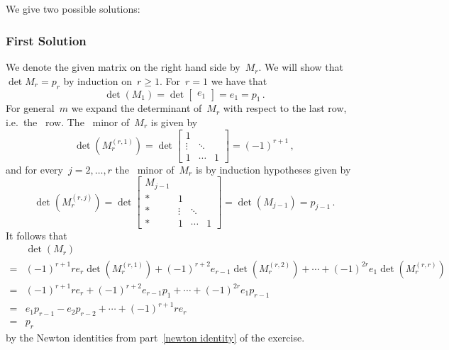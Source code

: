 \subsection{}

We give two possible solutions:



\subsubsection{First Solution}

We denote the given matrix on the right hand side by~$M_r$.
We will show that~$\det M_r = p_r$ by induction on~$r \geq 1$.
For~$r = 1$ we have that
\[
    \det( M_1 )
  = \det
    \begin{bmatrix}
      e_1
    \end{bmatrix}
  = e_1
  = p_1 \,.
\]
For general~$m$ we expand the determinant of~$M_r$ with respect to the last row, i.e.\ the~ row.
The~ minor of~$M_r$ is given by
\[
    \det( M_r^{(r,1)} )
  = \det
    \begin{bmatrix}
      1       &         &   \\
      \vdots  & \ddots  &   \\
      1       & \cdots  & 1
    \end{bmatrix}
  = (-1)^{r+1} \,,
\]
and for every~$j = 2, \dotsc, r$ the~ minor of~$M_r$ is by induction hypotheses given by
\[
    \det( M_r^{(r,j)} )
  = \det
    \begin{bmatrix}
      M_{j-1}   &         &         &   \\
      *         & 1       &         &   \\
      *         & \vdots  & \ddots  &   \\
      *         & 1       & \cdots  & 1
    \end{bmatrix}
  = \det( M_{j-1} )
  = p_{j-1} \,.
\]
It follows that
\begin{align*}
   {}&  \det(M_r) \\
  ={}&    (-1)^{r+1} r e_r\det( M_r^{(r,1)} )
        + (-1)^{r+2} e_{r-1} \det( M_r^{(r,2)} )
        + \dotsb
        + (-1)^{2r}  e_1 \det( M_r^{(r,r)} )  \\
  ={}&    (-1)^{r+1} r e_r
        + (-1)^{r+2} e_{r-1} p_1
        + \dotsb
        + (-1)^{2r} e_1 p_{r-1} \\
  ={}&    e_1 p_{r-1}
        - e_2 p_{r-2}
        + \dotsb
        + (-1)^{r+1} r e_r  \\
  ={}&  p_r
\end{align*}
by the Newton identities from part~\ref*{newton identity} of the exercise.






